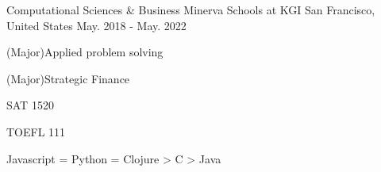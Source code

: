 \begin{cventries}
  \cventry
    {Computational Sciences \& Business}
    {Minerva Schools at KGI}
    {San Francisco, United States}
    {May. 2018 - May. 2022}
    {
      \begin{cvitems}
        \item {(Major)Applied problem solving}
        \item {(Major)Strategic Finance}
        \item {SAT 1520}
        \item {TOEFL 111}
        \item {Javascript = Python = Clojure > C > Java}
      \end{cvitems}
    }
\end{cventries}
